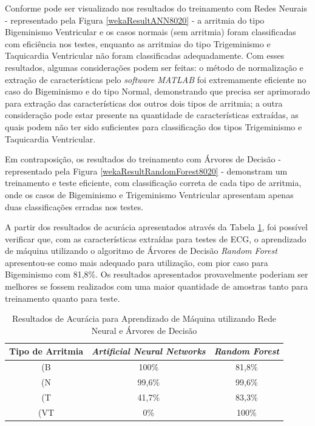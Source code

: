 \documentclass[conference]{IEEEtran}
\begin{document}
Conforme pode ser visualizado nos resultados do treinamento com Redes Neurais - representado pela Figura \ref{wekaResultANN8020} - a arritmia do tipo Bigeminismo Ventricular e os casos normais (sem arritmia) foram classificadas com eficiência nos testes, enquanto as arritmias do tipo Trigeminismo e Taquicardia Ventricular não foram classificadas adequadamente. Com esses resultados, algumas considerações podem ser feitas: o método de normalização e extração de características pelo \textit{software MATLAB} foi extremamente eficiente no caso do Bigeminismo e do tipo Normal, demonstrando que precisa ser aprimorado para extração das características dos outros dois tipos de arritmia; a outra consideração pode estar presente na quantidade de características extraídas, as quais podem não ter sido suficientes para classificação dos tipos Trigeminismo e Taquicardia Ventricular.

Em contraposição, os resultados do treinamento com Árvores de Decisão - representado pela Figura \ref{wekaResultRandomForest8020} - demonstram um treinamento e teste eficiente, com classificação correta de cada tipo de arritmia, onde os casos de Bigeminismo e Trigeminismo Ventricular apresentam apenas duas classificações erradas nos testes.

A partir dos resultados de acurácia apresentados através da Tabela \ref{table:tabelaResultadosAprendizadoMaquina}, foi possível verificar que, com as características extraídas para testes de ECG, o aprendizado de máquina utilizando o algoritmo de Árvores de Decisão \textit{Random Forest} apresentou-se como mais adequado para utilização, com pior caso para Bigeminismo com 81,8\%. Os resultados apresentados provavelmente poderiam ser melhores se fossem realizados com uma maior quantidade de amostras tanto para treinamento quanto para teste.

\renewcommand\tablename{TABELA}
\begin{table}[!h]
	\renewcommand{\arraystretch}{1.3}
	\caption{Resultados de Acurácia para Aprendizado de Máquina utilizando Rede Neural e Árvores de Decisão}
	\label{table:tabelaResultadosAprendizadoMaquina}
	\centering
	\begin{tabular}{|c|c|c|}
		\hline
		\textbf{Tipo de Arritmia} & \textbf{\textit{Artificial Neural Networks}} & \textbf{\textit{Random Forest}}\\
		\hline
		(B & 100\% & 81,8\% \\		
		\hline
		(N & 99,6\% & 99,6\% \\		
		\hline
		(T & 41,7\% & 83,3\% \\		
		\hline
		(VT & 0\% & 100\% \\		
		\hline
	\end{tabular}
\end{table}
\end{document}
